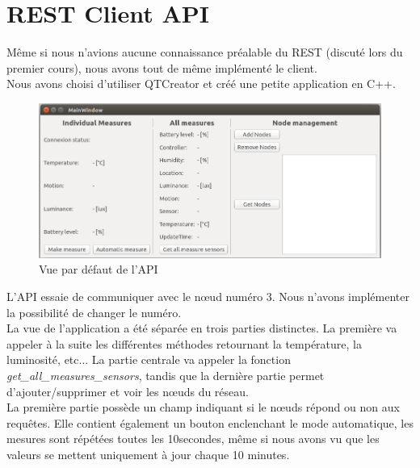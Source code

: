 \section{REST Client API}
Même si nous n'avions aucune connaissance préalable du REST (discuté lors du premier cours), nous avons tout de même implémenté le client.\\
Nous avons choisi d'utiliser QTCreator et créé une petite application en C++.
\begin{figure}[H]
	\begin{center}
		\includegraphics[width=17cm]{img/api.png}
		\caption{Vue par défaut de l'API}
		\label{api}
	\end{center}
\end{figure}
L'API essaie de communiquer avec le nœud  numéro 3. Nous n'avons implémenter la possibilité de changer le numéro.\\
La vue de l'application a été séparée en trois parties distinctes. La première va appeler à la suite les différentes méthodes retournant la température, la luminosité, etc... La partie centrale va appeler la fonction \textit{get\_all\_measures\_sensors}, tandis que la dernière partie permet d'ajouter/supprimer et voir les nœuds du réseau.\\
La première partie possède un champ indiquant si le nœuds répond ou non aux requêtes. Elle contient également un bouton enclenchant le mode automatique, les mesures sont répétées toutes les 10secondes, même si nous avons vu que les valeurs se mettent uniquement à jour chaque 10 minutes.
